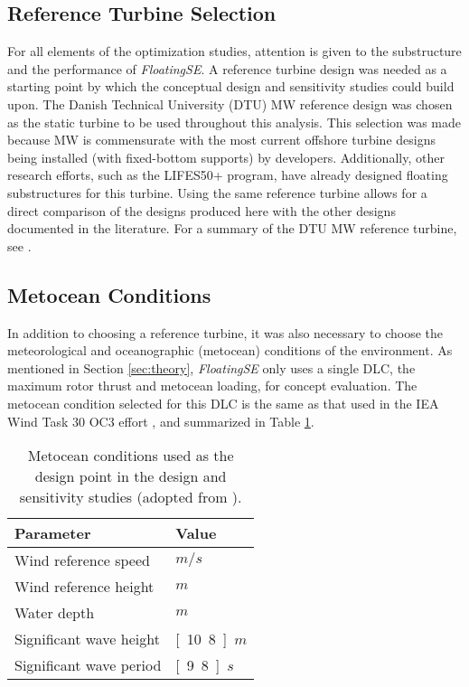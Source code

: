 \subsection{Reference Turbine Selection}
For all elements of the optimization studies, attention is given to the
substructure and the performance of \textit{FloatingSE}.  A reference
turbine design was needed as a starting point by which the conceptual
design and sensitivity studies could build upon.  The Danish Technical
University (DTU) \unit[10]{MW} reference design was chosen as the static
turbine to be used throughout this analysis.  This selection was made
because \unit[10]{MW} is commensurate with the most current offshore
turbine designs being installed (with fixed-bottom supports) by
developers.  Additionally, other research efforts, such as the LIFES50+
program, have already designed floating substructures for this turbine.
Using the same reference turbine allows for a direct comparison of the
designs produced here with the other designs documented in the
literature.  For a summary of the DTU \unit[10]{MW} reference turbine,
see \citet{dtu10mw}.


\subsection{Metocean Conditions}
In addition to choosing a reference turbine, it was also necessary to
choose the meteorological and oceanographic (metocean) conditions of the
environment.  As mentioned in Section \ref{sec:theory},
\textit{FloatingSE} only uses a single DLC, the maximum rotor thrust and
metocean loading, for concept evaluation.  The metocean condition
selected for this DLC is the same as that used in the IEA Wind Task 30
OC3 effort \citep{OC3}, and summarized in Table \ref{tbl:metocean}.

\begin{table}[htbp] \begin{center}
    \caption{Metocean conditions used as the design point in the design
      and sensitivity studies (adopted from \citet{OC3}).}
    \label{tbl:metocean}
          {\small
            \begin{tabular}{ l l } \hline
              \textbf{Parameter} & \textbf{Value} \\ \hline \hline
              Wind reference speed & \unit[11]{$m/s$} \\
              Wind reference height & \unit[119]{$m$} \\
              Water depth & \unit[320]{$m$} \\
              Significant wave height & \unit[10.8]{$m$} \\
              Significant wave period & \unit[9.8]{$s$} \\ \hline
            \end{tabular}
          }
\end{center} \end{table}


